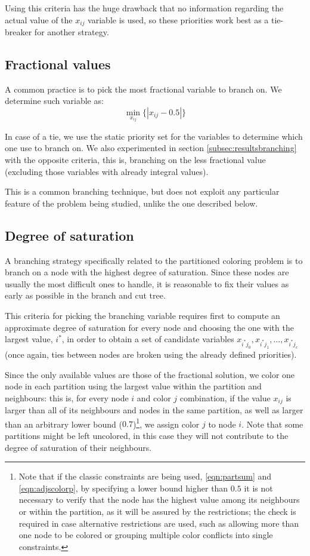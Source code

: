 Using this criteria has the huge drawback that no information regarding the actual value of the $x_{ij}$ variable is used, so these priorities work best as a tie-breaker for another strategy.

\subsection{Fractional values}
\label{subsubsec:alg:branch:frac}

A common practice is to pick the most fractional variable to branch on. We determine such variable as:
\[
\min_{x_{ij}} \{ |x_{ij} - 0.5| \}
\]

In case of a tie, we use the static priority set for the variables to determine which one use to branch on. We also experimented in section \ref{subsec:resultsbranching} with the opposite criteria, this is, branching on the less fractional value (excluding those variables with already integral values).

This is a common branching technique, but does not exploit any particular feature of the problem being studied, unlike the one described below.

\subsection{Degree of saturation}
\label{subsubsec:alg:branch:dsatur}

A branching strategy specifically related to the partitioned coloring problem is to branch on a node with the highest degree of saturation. Since these nodes are usually the most difficult ones to handle, it is reasonable to fix their values as early as possible in the branch and cut tree.

This criteria for picking the branching variable requires first to compute an approximate degree of saturation for every node and choosing the one with the largest value, $i^*$, in order to obtain a set of candidate variables $x_{i^*j_0}, x_{i^*j_1}, \ldots, x_{i^*j_c}$ (once again, ties between nodes are broken using the already defined priorities).

Since the only available values are those of the fractional solution, we color one node in each partition using the largest value within the partition and neighbours: this is, for every node $i$ and color $j$ combination, if the value $x_{ij}$ is larger than all of its neighbours and nodes in the same partition, as well as larger than an arbitrary lower bound ($0.7$)\footnote{Note that if the classic constraints are being used, \ref{eqn:partsum} and \ref{eqn:adjscolorp}, by specifying a lower bound higher than $0.5$ it is not necessary to verify that the node has the highest value among its neighbours or within the partition, as it will be assured by the restrictions; the check is required in case alternative restrictions are used, such as allowing more than one node to be colored or grouping multiple color conflicts into single constraints.}, we assign color $j$ to node $i$. Note that some partitions might be left uncolored, in this case they will not contribute to the degree of saturation of their neighbours.

